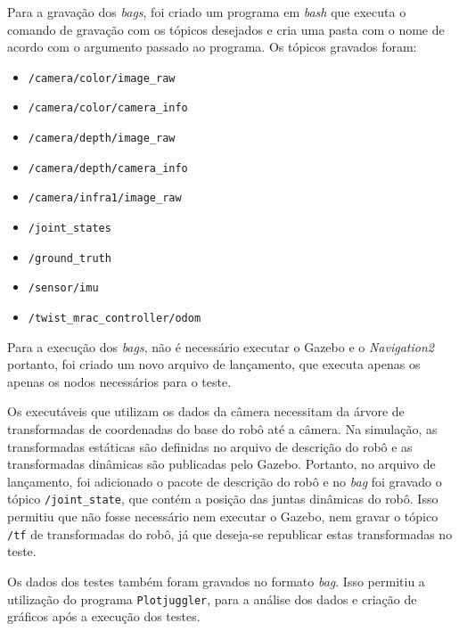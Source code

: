 \documentclass[repeatfields,xlists,xpacks,oneside,yearsonly]{ufrgscca}
\begin{document}
Para a gravação dos \textit{bags}, foi criado um programa em \textit{bash} 
que executa o comando de gravação com os tópicos desejados e cria uma pasta 
com o nome de acordo com o argumento passado ao programa.
Os tópicos gravados foram:
\begin{itemize}
    \item \texttt{/camera/color/image\_raw}
    \item \texttt{/camera/color/camera\_info}
    \item \texttt{/camera/depth/image\_raw}
    \item \texttt{/camera/depth/camera\_info}
    \item \texttt{/camera/infra1/image\_raw}
    \item \texttt{/joint\_states}
    \item \texttt{/ground\_truth}
    \item \texttt{/sensor/imu}
    \item \texttt{/twist\_mrac\_controller/odom}
\end{itemize}






Para a execução dos \textit{bags}, não é necessário executar o Gazebo e o 
\textit{Navigation2} portanto, foi criado um novo arquivo de lançamento,
que executa apenas os apenas os nodos necessários para o teste.

Os executáveis que utilizam os dados da câmera necessitam da árvore de
transformadas de coordenadas do base do robô até a câmera.
Na simulação, as transformadas estáticas são definidas no arquivo de descrição
do robô e as transformadas dinâmicas são publicadas pelo Gazebo.
Portanto, no arquivo de lançamento, foi adicionado o pacote 
de descrição do robô e no \textit{bag} foi gravado o tópico
\texttt{/joint\_state}, que contém a posição das juntas dinâmicas do robô.
Isso permitiu que não fosse necessário nem executar o Gazebo, nem gravar
o tópico \texttt{/tf} de transformadas do robô, já que deseja-se republicar
estas transformadas no teste.

Os dados dos testes também foram gravados no formato \textit{bag}. 
Isso permitiu a utilização do programa 
\texttt{Plotjuggler}, para a análise
dos dados e criação de gráficos após a execução dos testes.
\end{document}
